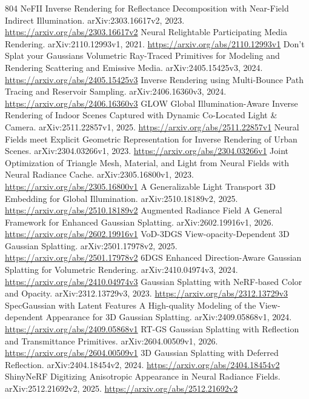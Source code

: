 \documentclass[11pt]{article}
\begin{document}
\begin{thebibliography}{804}
 NeFII Inverse Rendering for Reflectance Decomposition with Near-Field Indirect Illumination. arXiv:2303.16617v2, 2023. \url{https://arxiv.org/abs/2303.16617v2}
 Neural Relightable Participating Media Rendering. arXiv:2110.12993v1, 2021. \url{https://arxiv.org/abs/2110.12993v1}
 Don't Splat your Gaussians Volumetric Ray-Traced Primitives for Modeling and Rendering Scattering and Emissive Media. arXiv:2405.15425v3, 2024. \url{https://arxiv.org/abs/2405.15425v3}
 Inverse Rendering using Multi-Bounce Path Tracing and Reservoir Sampling. arXiv:2406.16360v3, 2024. \url{https://arxiv.org/abs/2406.16360v3}
 GLOW Global Illumination-Aware Inverse Rendering of Indoor Scenes Captured with Dynamic Co-Located Light \& Camera. arXiv:2511.22857v1, 2025. \url{https://arxiv.org/abs/2511.22857v1}
 Neural Fields meet Explicit Geometric Representation for Inverse Rendering of Urban Scenes. arXiv:2304.03266v1, 2023. \url{https://arxiv.org/abs/2304.03266v1}
 Joint Optimization of Triangle Mesh, Material, and Light from Neural Fields with Neural Radiance Cache. arXiv:2305.16800v1, 2023. \url{https://arxiv.org/abs/2305.16800v1}
 A Generalizable Light Transport 3D Embedding for Global Illumination. arXiv:2510.18189v2, 2025. \url{https://arxiv.org/abs/2510.18189v2}
 Augmented Radiance Field A General Framework for Enhanced Gaussian Splatting. arXiv:2602.19916v1, 2026. \url{https://arxiv.org/abs/2602.19916v1}
 VoD-3DGS View-opacity-Dependent 3D Gaussian Splatting. arXiv:2501.17978v2, 2025. \url{https://arxiv.org/abs/2501.17978v2}
 6DGS Enhanced Direction-Aware Gaussian Splatting for Volumetric Rendering. arXiv:2410.04974v3, 2024. \url{https://arxiv.org/abs/2410.04974v3}
 Gaussian Splatting with NeRF-based Color and Opacity. arXiv:2312.13729v3, 2023. \url{https://arxiv.org/abs/2312.13729v3}
 SpecGaussian with Latent Features A High-quality Modeling of the View-dependent Appearance for 3D Gaussian Splatting. arXiv:2409.05868v1, 2024. \url{https://arxiv.org/abs/2409.05868v1}
 RT-GS Gaussian Splatting with Reflection and Transmittance Primitives. arXiv:2604.00509v1, 2026. \url{https://arxiv.org/abs/2604.00509v1}
 3D Gaussian Splatting with Deferred Reflection. arXiv:2404.18454v2, 2024. \url{https://arxiv.org/abs/2404.18454v2}
 ShinyNeRF Digitizing Anisotropic Appearance in Neural Radiance Fields. arXiv:2512.21692v2, 2025. \url{https://arxiv.org/abs/2512.21692v2}

\end{thebibliography}
\end{document}
